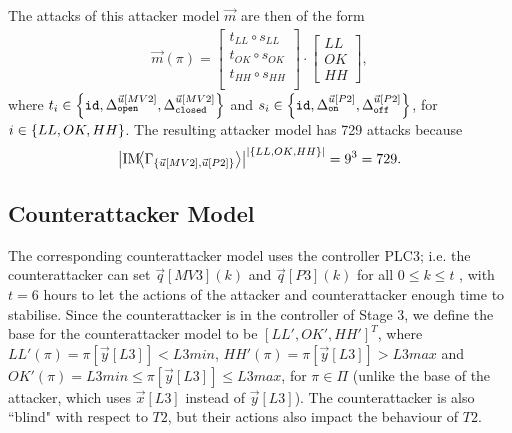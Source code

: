 {{The attacks of this attacker model $\vec{m}$ are then of the form
\begin{align*}
  \vec{m}(\pi)=
  \begin{bmatrix}
    t_{LL}\circ s_{LL} \\
    t_{OK}\circ s_{OK} \\
    t_{HH}\circ s_{HH} \\
  \end{bmatrix}
  \cdot
  \begin{bmatrix}
    LL \\
    OK \\
    HH
  \end{bmatrix},
\end{align*} 
where $t_i\in \left\{{\texttt{id}},{\Delta}^{\vec{u}[MV2]}_{\texttt{open}}, {\Delta}^{\vec{u}[MV2]}_{\texttt{closed}}\right\}$ and  $s_i\in\left\{{\texttt{id}},{\Delta}^{\vec{u}[P2]}_{\texttt{on}}, {\Delta}^{\vec{u}[P2]}_{\texttt{off}}\right\}$, for $i\in \left\{LL,OK,HH\right\}$. The resulting attacker model has 729 attacks because
 \begin{align*}
  \left| \text{IM}\!{{\left<\Gamma_{\left\{\vec{u}[MV2],\vec{u}[P2]\right\}}\right>}}\right|^{\left|\left\{{LL},{OK},{HH}\right\}\right|}=9^3=729.
\end{align*}

\subsection{Counterattacker Model}
The corresponding counterattacker model uses the controller PLC3; i.e. the counterattacker can set $\vec{q}[MV3](k)$ and $\vec{q}[P3](k)$ for all $0\leq k\leq t$ , with  $t=6$ hours to let the actions of the attacker and counterattacker enough time to stabilise. Since the counterattacker is in the controller of Stage 3, we define the base for the counterattacker model to be $[LL', OK', HH']^T$, where ${LL'}(\pi)=\pi[\vec{y}[L3]]<L3min$, ${HH'}(\pi)=\pi[\vec{y}[L3]]>L3max$ and ${OK'}(\pi)=L3min \leq \pi[\vec{y}[L3]]\leq L3max$, for $\pi \in \Pi$ (unlike the base of the attacker, which uses $\vec{x}[L3]$ instead of $\vec{y}[L3]$). The counterattacker is also ``blind" with respect to $T2$, but their actions also impact the behaviour of $T2$. 

}}
